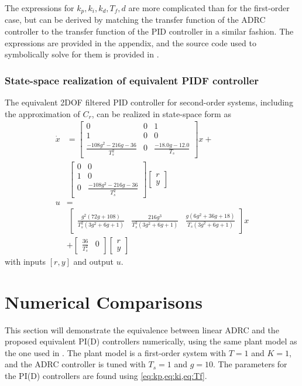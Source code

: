 \documentclass[letterpaper, 10 pt, conference]{ieeeconf}
\newcommand{\bmatrixx}[1]{\begin{bmatrix}#1\end{bmatrix}}
\begin{document}
The expressions for $k_p, k_i, k_d, T_f, d$ are more complicated than for the first-order case, but can be derived by matching the transfer function of the ADRC controller to the transfer function of the PID controller in a similar fashion. The expressions are provided in the appendix, and the source code used to symbolically solve for them is provided in \cite{repo}.


\subsubsection{State-space realization of equivalent PIDF controller}
The equivalent 2DOF filtered PID controller for second-order systems, including the approximation of $C_r$, can be realized in state-space form as
\begin{align*}
	\dot{x} &= \left[\begin{matrix}0 & 0 & 1\\1 & 0 & 0\\\frac{- 108 g^{2} - 216 g - 36}{T_{s}^{2}} & 0 & \frac{- 18.0 g - 12.0}{T_{s}}\end{matrix}\right]x + \\
	~ &~ \left[\begin{matrix}0 & 0\\1 & 0\\0 & \frac{- 108 g^{2} - 216 g - 36}{T_{s}^{2}}\end{matrix}\right] \bmatrixx{r \\ y} \\
	u &= \\
	~ &~ \left[\begin{matrix}\frac{g^{2} \left(72 g + 108\right)}{T_{s}^{2} \left(3 g^{2} + 6 g + 1\right)} & \frac{216 g^{3}}{T_{s}^{3} \left(3 g^{2} + 6 g + 1\right)} & \frac{g \left(6 g^{2} + 36 g + 18\right)}{T_{s} \left(3 g^{2} + 6 g + 1\right)}\end{matrix}\right]x \\ 
	~ &+ \left[\begin{matrix}\frac{36}{T_{s}^{2}} & 0\end{matrix}\right] \bmatrixx{r \\ y}
\end{align*}
with inputs $[r, y]$ and output $u$.

\section{Numerical Comparisons} \label{sec:numerical}
This section will demonstrate the equivalence between linear ADRC and the proposed equivalent PI(D) controllers numerically, using the same plant model as the one used in \cite{herbst2013simulative}. The plant model is a first-order system with $T = 1$ and $K = 1$, and the ADRC controller is tuned with $T_s = 1$ and $g = 10$. The parameters for the PI(D) controllers are found using \cref{eq:kp,eq:ki,eq:Tf}.
\end{document}
